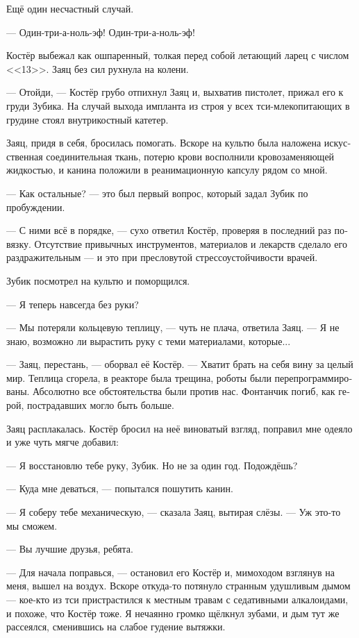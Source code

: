 \documentclass[a4paper,12pt,fleqn]{book}\usepackage{cooltooltips}\usepackage{polyglossia}\setdefaultlanguage[babelshorthands=true]{russian}\setotherlanguage{english}\defaultfontfeatures{Ligatures=TeX,Mapping=tex-text} \usepackage{xcolor}\definecolor{lightgray}{HTML}{bbbbbb}\color{lightgray}\newcommand{\ml}[3]{\textenglish{\textcolor{black}{#3}}}
\begin{document}
{Ещё один несчастный случай.

--- Один-три-а-ноль-эф!
Один-три-а-ноль-эф!

Костёр выбежал как ошпаренный, толкая перед собой летающий ларец с числом <<13>>.
Заяц без сил рухнула на колени.

--- Отойди, --- Костёр грубо отпихнул Заяц и, выхватив пистолет, прижал его к груди Зубика.
На случай выхода импланта из строя у всех тси-млекопитающих в грудине стоял внутрикостный катетер.

Заяц, придя в себя, бросилась помогать.
Вскоре на культю была наложена искусственная соединительная ткань, потерю крови восполнили кровозаменяющей жидкостью, и канина положили в реанимационную капсулу рядом со мной.

--- Как остальные? --- это был первый вопрос, который задал Зубик по пробуждении.

--- С ними всё в порядке, --- сухо ответил Костёр, проверяя в последний раз повязку.
Отсутствие привычных инструментов, материалов и лекарств сделало его раздражительным --- и это при пресловутой стрессоустойчивости врачей.

Зубик посмотрел на культю и поморщился.

--- Я теперь навсегда без руки?

--- Мы потеряли кольцевую теплицу, --- чуть не плача, ответила Заяц.
--- Я не знаю, возможно ли вырастить руку с теми материалами, которые...

--- Заяц, перестань, --- оборвал её Костёр.
--- Хватит брать на себя вину за целый мир.
Теплица сгорела, в реакторе была трещина, роботы были перепрограммированы.
Абсолютно все обстоятельства были против нас.
Фонтанчик погиб, как герой, пострадавших могло быть больше.

Заяц расплакалась.
Костёр бросил на неё виноватый взгляд, поправил мне одеяло и уже чуть мягче добавил:

--- Я восстановлю тебе руку, Зубик.
Но не за один год.
Подождёшь?

--- Куда мне деваться, --- попытался пошутить канин.

--- Я соберу тебе механическую, --- сказала Заяц, вытирая слёзы.
--- Уж это-то мы сможем.

--- Вы лучшие друзья, ребята.

--- Для начала поправься, --- остановил его Костёр и, мимоходом взглянув на меня, вышел на воздух.
Вскоре откуда-то потянуло странным удушливым дымом --- кое-кто из тси пристрастился к местным травам с седативными алкалоидами, и похоже, что Костёр тоже.
Я нечаянно громко щёлкнул зубами, и дым тут же рассеялся, сменившись на слабое гудение вытяжки.

}
\end{document}
